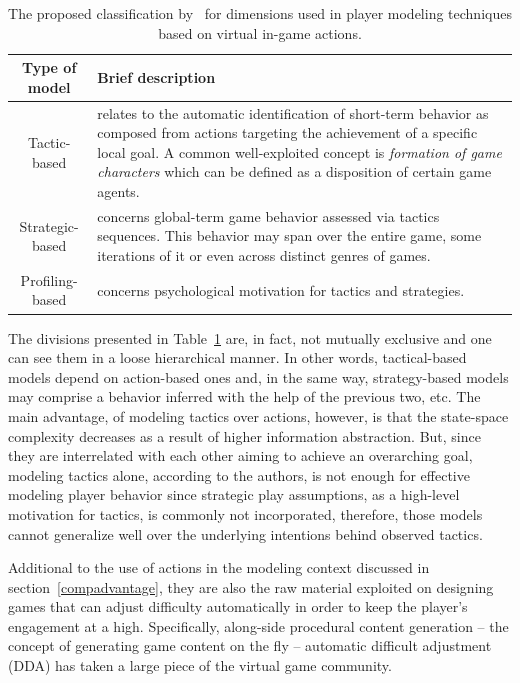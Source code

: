 \begin{table}[!ht]
\centering
\caption{The proposed classification by~\cite{bakkes_player_2012} for dimensions used in player modeling techniques based on virtual in-game actions.}
\label{actionModels}
\begin{tabularx}{\textwidth}{|c|X|} \hline
\textbf{Type of model}&\textbf{Brief description}\\ \hline
Tactic-based & relates to the automatic identification of short-term behavior as composed from actions targeting the achievement of a specific local goal. A common well-exploited concept is \textit{formation of game characters} which can be defined as a disposition of certain game agents.\\ \hline
Strategic-based & concerns global-term game behavior assessed via tactics sequences. This behavior may span over the entire game, some iterations of it or even across distinct genres of games.\\ \hline
Profiling-based & concerns psychological motivation for tactics and strategies.\\ \hline
\end{tabularx}
\end{table}

The divisions presented in Table~\ref{actionModels} are, in fact, not mutually exclusive and one can see them in a loose hierarchical manner. In other words, tactical-based models depend on action-based ones and, in the same way, strategy-based models may comprise a behavior inferred with the help of the previous two, etc. The main advantage, of modeling tactics over actions, however, is that the state-space complexity decreases as a result of higher information abstraction. But, since they are interrelated with each other aiming to achieve an overarching goal, modeling tactics alone, according to the authors, is not enough for effective modeling player behavior since strategic play assumptions, as a high-level motivation for tactics, is commonly not incorporated, therefore, those models cannot generalize well over the underlying intentions behind observed tactics.

Additional to the use of actions in the modeling context discussed in section~\ref{compadvantage}, they are also the raw material exploited on designing games that can adjust difficulty automatically in order to keep the player's engagement at a high. Specifically, along-side procedural content generation -- the concept of generating game content on the fly -- automatic difficult adjustment (DDA) has taken a large piece of the virtual game community.

